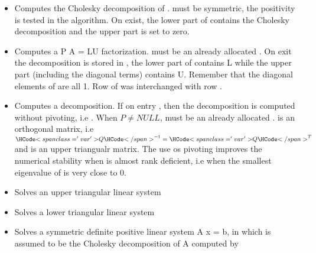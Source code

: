 \begin{itemize}
\item {}
  \sshortdescribe Computes the Cholesky decomposition of .  must
  be symmetric, the positivity is tested in the algorithm. On exist, the lower
  part of  contains the Cholesky decomposition and the upper part is
  set to zero.

\item {} 
  \sshortdescribe Computes a P A = LU factorization.  must be an
  already allocated  . On exit the decomposition is
  stored in , the lower part of  contains L while the upper part
  (including the diagonal terms) contains U. Remember that the diagonal
  elements of  are all 1. Row  of  was interchanged with
  row .
  
\item {} 
  \sshortdescribe Computes a  decomposition. If on entry
  , then the decomposition is computed without pivoting, i.e
  . When $P \ne NULL$,  must be an already allocated
  .  is an orthogonal matrix, i.e
  $\var{Q}^{-1} = \var{Q}^{T}$ and  is an upper triangualr matrix. The
  use os pivoting improves the numerical stability when  is almost rank
  deficient, i.e when the smallest eigenvalue of  is very close to $0$.

\item {}
  \sshortdescribe Solves an upper triangular linear system 

\item {}
  \sshortdescribe Solves a lower triangular linear system  
  
\item {} 
  \sshortdescribe Solves a symmetric definite positive linear system A x = b, 
  in which  is assumed to be the Cholesky decomposition of A
  computed by 


\end{itemize}
